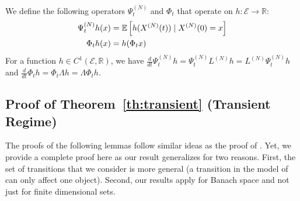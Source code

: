 \documentclass[acmlarge]{acmart}
\newcommand\XN{X^{(N)}}
\newcommand\LN{L^{(N)}}
\newcommand\PsiN{\Psi^{(N)}}
\newcommand\E{\mathcal{E}}
\newcommand\R{\mathbb{R}}
\newcommand\esp[1]{{\mathchoice{\besp{#1}}{\sesp{#1}}{\sesp{#1}}{\sesp{#1}}}}
\newcommand\besp[1]{\mathbb{E}\left[#1\right]}
\newcommand\sesp[1]{\mathbb{E}[#1]}
\newcommand\dt{\frac{d}{dt}}
\begin{document}
We define the following operators $\PsiN_t$ and $\Phi_t$ that operate
on $h:\E\to\R$:
\begin{align}
  \PsiN_t h (x) &= \esp{ h(\XN(t)) \mid \XN(0) = x} \label{eq:operatorN}\\
  \Phi_t h (x) &= h( \Phi_tx ) \label{eq:operatorInf}
\end{align}
For a function $h\in C^1(\E,\R)$, we have
$\dt \PsiN_th = \PsiN_t\LN h= \LN\PsiN_t h$ and
$\dt \Phi_th = \Phi_t\Lambda h= \Lambda\Phi_t h$.




\subsection{Proof of Theorem~\ref{th:transient} (Transient Regime)}
\label{sec:proof_t}

The proofs of the following lemmas follow similar ideas as the proof
of \cite[Theorem~1]{kolokoltsov2011mean}. Yet, we provide a complete
proof here as our result generalizes
\cite[Theorem~1]{kolokoltsov2011mean} for two reasons.  First, the set
of transitions that we consider is more general (a transition in the
model of \cite{kolokoltsov2011mean} can only affect one
object). Second, our results apply for Banach space and not just for
finite dimensional sets.
\end{document}

